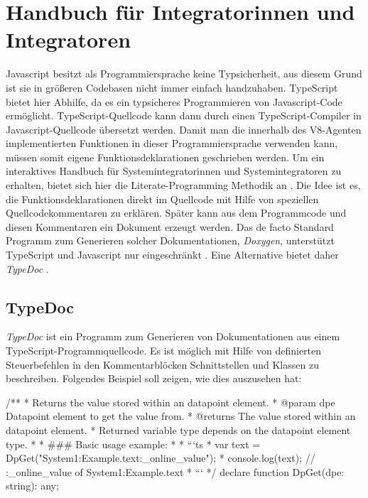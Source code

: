 \section{Handbuch für Integratorinnen und Integratoren}

Javascript besitzt als Programmiersprache keine Typsicherheit, aus diesem Grund ist sie in größeren Codebasen nicht
immer einfach handzuhaben. TypeScript bietet hier Abhilfe, da es ein typsicheres Programmieren von Javascript-Code
ermöglicht. TypeScript-Quellcode kann dann durch einen TypeScript-Compiler in Javascript-Quellcode übersetzt werden.
Damit man die innerhalb des V8-Agenten implementierten Funktionen in dieser Programmiersprache verwenden kann, müssen somit
eigene Funktionsdeklarationen geschrieben werden. Um ein interaktives Handbuch für Systemintegratorinnen und Systemintegratoren
zu erhalten, bietet sich hier die Literate-Programming Methodik an \cite{LiterateProgramming}. Die Idee ist es, die Funktionsdeklarationen
direkt im Quellcode mit Hilfe von speziellen Quellcodekommentaren zu erklären. Später kann aus dem Programmcode und diesen 
Kommentaren ein Dokument erzeugt werden. Das de facto Standard Programm zum Generieren solcher Dokumentationen, \textit{Doxygen},
unterstützt TypeScript und Javascript nur eingeschränkt \cite{DoxyGen}. Eine Alternative bietet daher \textit{TypeDoc} \cite{typedoc}.

\subsection{TypeDoc}

\textit{TypeDoc} ist ein Programm zum Generieren von Dokumentationen aus einem TypeScript-Programmquellcode.
Es ist möglich mit Hilfe von definierten Steuerbefehlen in den Kommentarblöcken Schnittstellen und Klassen zu beschreiben.
Folgendes Beispiel soll zeigen, wie dies auszusehen hat:

\begin{program}[h]
\caption{TypeDoc Beispiel.}
\label{src:typedoc}
\begin{GenericCode}
/**
* Returns the value stored within an datapoint element.
* @param dpe Datapoint element to get the value from.
* @returns The value stored within an datapoint element.
* Returned variable type depends on the datapoint element type.
*
* ### Basic usage example: 
* 
* ```ts
* var text = DpGet("System1:Example.text:_online_value");
* console.log(text); // :_online_value of System1:Example.text
* ```
*/
declare function DpGet(dpe: string): any;
\end{GenericCode}
\end{program}

